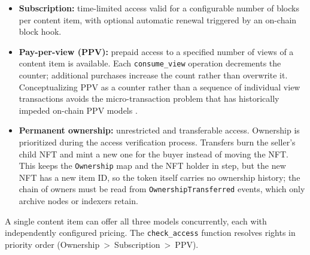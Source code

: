 \begin{itemize}
\item \textbf{Subscription:} time-limited access valid for a configurable number of blocks per content item, with optional automatic renewal triggered by an on-chain block hook.
\item \textbf{Pay-per-view (PPV):} prepaid access to a specified number of views of a content item is available. Each \texttt{consume\_view} operation decrements the counter; additional purchases increase the count rather than overwrite it. Conceptualizing PPV as a counter rather than a sequence of individual view transactions avoids the micro-transaction problem that has historically impeded on-chain PPV models \citep{chegenizadehEtAl2024}.
\item \textbf{Permanent ownership:} unrestricted and transferable access. Ownership is prioritized during the access verification process. Transfers burn the seller's child NFT and mint a new one for the buyer instead of moving the NFT. This keeps the \texttt{Ownership} map and the NFT holder in step, but the new NFT has a new item ID, so the token itself carries no ownership history; the chain of owners must be read from \texttt{OwnershipTransferred} events, which only archive nodes or indexers retain.
\end{itemize}

A single content item can offer all three models concurrently, each with independently configured pricing. The \texttt{check\_access} function resolves rights in priority order (Ownership~>~Subscription~>~PPV).

